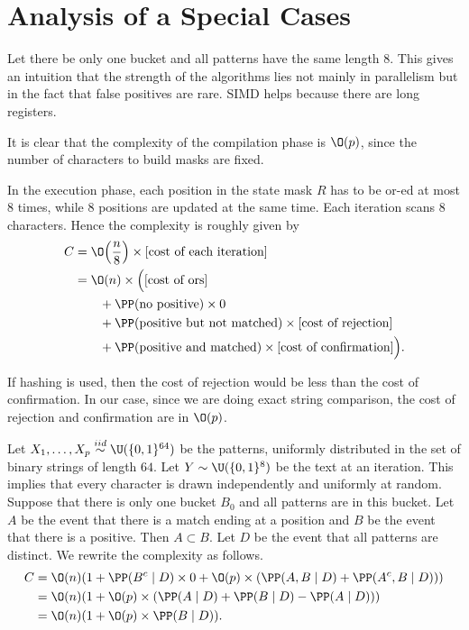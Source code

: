 \section{Analysis of a Special Cases}

Let there be only one bucket and all patterns have the same length $8$. This gives an intuition that the strength of the algorithms lies not mainly in parallelism but in the fact that false positives are rare. SIMD helps because there are long registers.

It is clear that the complexity of the compilation phase is $\O(p)$, since the number of characters to build masks are fixed.

In the execution phase, each position in the state mask $R$ has to be or-ed at most $8$ times, while $8$ positions are updated at the same time. Each iteration scans $8$ characters. Hence the complexity is roughly given by
\[
  \begin{aligned}
    C & = \O\!\left(\frac{n}{8}\right)\times [\text{cost of each iteration}]                 \\
      & = \O(n)\times\Big( [\text{cost of ors}]                                              \\
      & \qquad + \PP(\text{no positive})\times 0                                             \\
      & \qquad + \PP(\text{positive but not matched})\times[\text{cost of rejection}]        \\
      & \qquad + \PP(\text{positive and matched})\times [\text{cost of confirmation}] \Big).
  \end{aligned}
\]

If hashing is used, then the cost of rejection would be less than the cost of confirmation. In our case, since we are doing exact string comparison, the cost of rejection and confirmation are in $\O(p)$.

Let $X_1,\ldots,X_p\overset{iid}{\sim}\U(\{0,1\}^{64})$ be the patterns, uniformly distributed in the set of binary strings of length $64$. Let $Y\sim \U(\{0,1\}^{8})$ be the text at an iteration. This implies that every character is drawn independently and uniformly at random. Suppose that there is only one bucket $B_0$ and all patterns are in this bucket. Let $A$ be the event that there is a match ending at a position and $B$ be the event that there is a positive. Then $A\subset B$. Let $D$ be the event that all patterns are distinct. We rewrite the complexity as follows.
\begin{align*}
  C & = \O(n)(1 + \PP(B^c\mid D)\times 0 + \O(p)\times (\PP(A,B\mid D) + \PP(A^c,B\mid D))) \\
    & = \O(n)(1 + \O(p)\times (\PP(A\mid D) + \PP(B\mid D) - \PP(A\mid D)))                 \\
    & = \O(n)(1 + \O(p)\times \PP(B\mid D)).
\end{align*}

